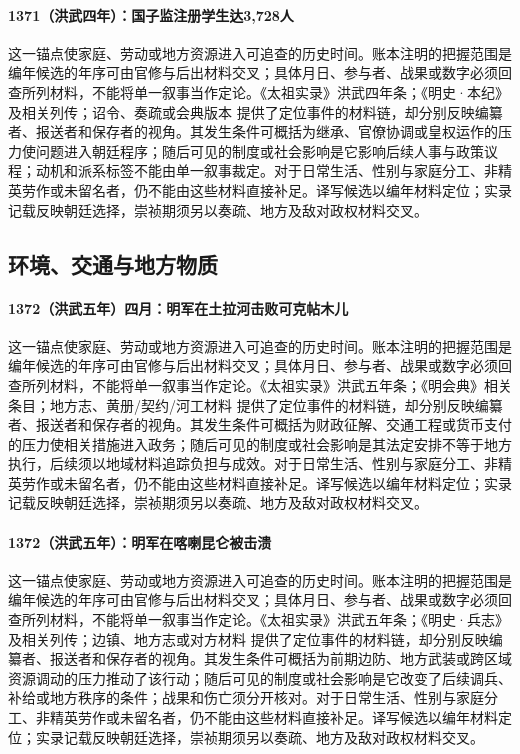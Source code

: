\paragraph{1371（洪武四年）：国子监注册学生达3,728人} 这一锚点使家庭、劳动或地方资源进入可追查的历史时间。账本注明的把握范围是编年候选的年序可由官修与后出材料交叉；具体月日、参与者、战果或数字必须回查所列材料，不能将单一叙事当作定论。《太祖实录》洪武四年条；《明史·本纪》及相关列传；诏令、奏疏或会典版本 提供了定位事件的材料链，却分别反映编纂者、报送者和保存者的视角。其发生条件可概括为继承、官僚协调或皇权运作的压力使问题进入朝廷程序；随后可见的制度或社会影响是它影响后续人事与政策议程；动机和派系标签不能由单一叙事裁定。对于日常生活、性别与家庭分工、非精英劳作或未留名者，仍不能由这些材料直接补足。译写候选以编年材料定位；实录记载反映朝廷选择，崇祯期须另以奏疏、地方及敌对政权材料交叉。

\subsection{环境、交通与地方物质}

\paragraph{1372（洪武五年）四月：明军在土拉河击败可克帖木儿} 这一锚点使家庭、劳动或地方资源进入可追查的历史时间。账本注明的把握范围是编年候选的年序可由官修与后出材料交叉；具体月日、参与者、战果或数字必须回查所列材料，不能将单一叙事当作定论。《太祖实录》洪武五年条；《明会典》相关条目；地方志、黄册/契约/河工材料 提供了定位事件的材料链，却分别反映编纂者、报送者和保存者的视角。其发生条件可概括为财政征解、交通工程或货币支付的压力使相关措施进入政务；随后可见的制度或社会影响是其法定安排不等于地方执行，后续须以地域材料追踪负担与成效。对于日常生活、性别与家庭分工、非精英劳作或未留名者，仍不能由这些材料直接补足。译写候选以编年材料定位；实录记载反映朝廷选择，崇祯期须另以奏疏、地方及敌对政权材料交叉。

\paragraph{1372（洪武五年）：明军在喀喇昆仑被击溃} 这一锚点使家庭、劳动或地方资源进入可追查的历史时间。账本注明的把握范围是编年候选的年序可由官修与后出材料交叉；具体月日、参与者、战果或数字必须回查所列材料，不能将单一叙事当作定论。《太祖实录》洪武五年条；《明史·兵志》及相关列传；边镇、地方志或对方材料 提供了定位事件的材料链，却分别反映编纂者、报送者和保存者的视角。其发生条件可概括为前期边防、地方武装或跨区域资源调动的压力推动了该行动；随后可见的制度或社会影响是它改变了后续调兵、补给或地方秩序的条件；战果和伤亡须分开核对。对于日常生活、性别与家庭分工、非精英劳作或未留名者，仍不能由这些材料直接补足。译写候选以编年材料定位；实录记载反映朝廷选择，崇祯期须另以奏疏、地方及敌对政权材料交叉。

